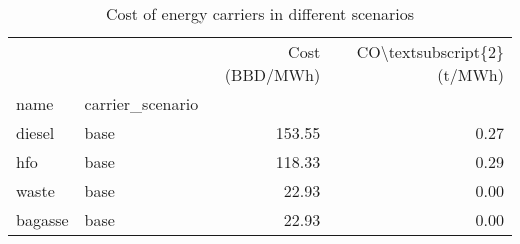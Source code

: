\begin{table}
\centering
\caption{Cost of energy carriers in different scenarios}
\label{tab:carrier_cost}
\begin{tabular}{llrr}
\toprule
        &      &  Cost (BBD/MWh) &  CO\textbackslash textsubscript\{2\} (t/MWh) \\
name & carrier\_scenario &                 &                              \\
\midrule
diesel & base &          153.55 &                         0.27 \\
hfo & base &          118.33 &                         0.29 \\
waste & base &           22.93 &                         0.00 \\
bagasse & base &           22.93 &                         0.00 \\
\bottomrule
\end{tabular}
\end{table}
